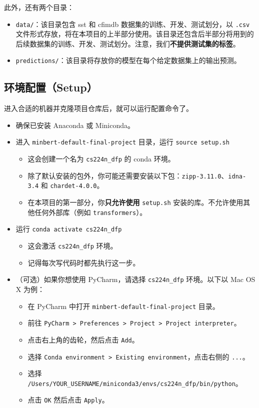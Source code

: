 \documentclass[11pt]{article}
\begin{document}
此外，还有两个目录：

\begin{itemize}[leftmargin=1.5em]
  \item \texttt{data/}：该目录包含 sst 和 cfimdb 数据集的训练、开发、测试划分，以 \texttt{.csv} 文件形式存放，将在本项目的上半部分使用。该目录还包含后半部分将用到的后续数据集的训练、开发、测试划分。注意，我们\textbf{不提供测试集的标签}。
  \item \texttt{predictions/}：该目录将存放你的模型在每个给定数据集上的输出预测。
\end{itemize}

\subsection{环境配置（Setup）}

进入合适的机器并克隆项目仓库后，就可以运行配置命令了。

\begin{itemize}[leftmargin=1.5em]
  \item 确保已安装 Anaconda 或 Miniconda。
  \item 进入 \texttt{minbert-default-final-project} 目录，运行 \texttt{source setup.sh}
    \begin{itemize}
      \item 这会创建一个名为 \texttt{cs224n\_dfp} 的 conda 环境。
      \item 除了默认安装的包外，你可能还需要安装以下包：\texttt{zipp-3.11.0}、\texttt{idna-3.4} 和 \texttt{chardet-4.0.0}。
      \item 在本项目的第一部分，你\textbf{只允许使用} \texttt{setup.sh} 安装的库。不允许使用其他任何外部库（例如 \texttt{transformers}）。
    \end{itemize}
  \item 运行 \texttt{conda activate cs224n\_dfp}
    \begin{itemize}
      \item 这会激活 \texttt{cs224n\_dfp} 环境。
      \item 记得每次写代码时都先执行这一步。
    \end{itemize}
  \item （可选）如果你想使用 PyCharm，请选择 \texttt{cs224n\_dfp} 环境。以下以 Mac OS X 为例：
    \begin{itemize}
      \item 在 PyCharm 中打开 \texttt{minbert-default-final-project} 目录。
      \item 前往 \texttt{PyCharm > Preferences > Project > Project interpreter}。
      \item 点击右上角的齿轮，然后点击 \texttt{Add}。
      \item 选择 \texttt{Conda environment > Existing environment}，点击右侧的 \texttt{...}。
      \item 选择 \texttt{/Users/YOUR\_USERNAME/miniconda3/envs/cs224n\_dfp/bin/python}。
      \item 点击 \texttt{OK} 然后点击 \texttt{Apply}。
    \end{itemize}
\end{itemize}
\end{document}
